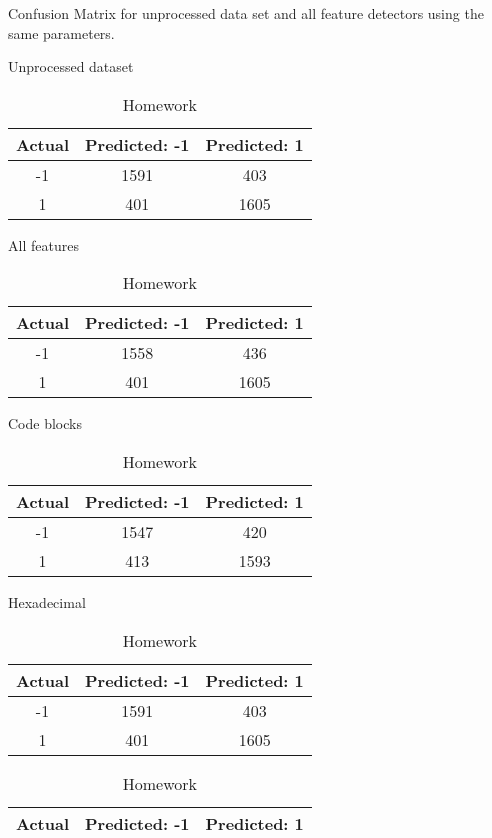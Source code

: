 \begin{table}[!htb]
	\caption{Confusion Matrix for unprocessed data set and all feature detectors using the same parameters.}
	\begin{minipage}{.5\linewidth}
		\caption{Unprocessed dataset}
		\centering
		\begin{tabular}{| c | c | c |}
			\hline
			Actual 		& Predicted: -1	& Predicted: 1	\\ \hline
			-1			& 1591			& 403			\\ \hline
			1			& 401			& 1605			\\ \hline
		\end{tabular}
	\end{minipage}%
	\begin{minipage}{.5\linewidth}
		\centering
		\caption{All features}
		\begin{tabular}{| c | c | c |}
			\hline
			Actual 		& Predicted: -1	& Predicted: 1	\\ \hline
			-1			& 1558			& 436			\\ \hline
			1			& 401			& 1605			\\ \hline
		\end{tabular}
	\end{minipage} 
	\begin{minipage}{.5\linewidth}
		\caption{Code blocks}
		\centering
		\begin{tabular}{| c | c | c |}
			\hline
			Actual 		& Predicted: -1	& Predicted: 1	\\ \hline
			-1			& 1547			& 420			\\ \hline
			1			& 413			& 1593			\\ \hline
		\end{tabular}
	\end{minipage}%
	\begin{minipage}{.5\linewidth}
		\centering
		\caption{Hexadecimal}
		\begin{tabular}{| c | c | c |}
			\hline
			Actual 		& Predicted: -1	& Predicted: 1	\\ \hline
			-1			& 1591			& 403			\\ \hline
			1			& 401			& 1605			\\ \hline
		\end{tabular}
	\end{minipage} 
	\begin{minipage}{.5\linewidth}
		\caption{Homework}
		\centering
		\begin{tabular}{| c | c | c |}
			\hline
			Actual 		& Predicted: -1	& Predicted: 1	\\ \hline

\end{tabular}
\end{minipage}
\end{table}

